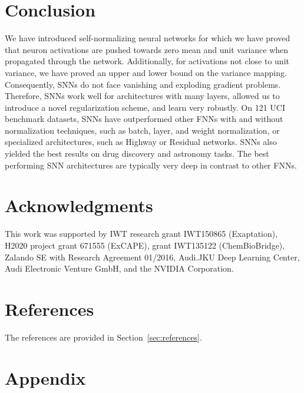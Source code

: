 \documentclass{article}
\begin{document}
\section*{Conclusion}
We have introduced self-normalizing neural networks for 
which we have proved that neuron activations are pushed towards zero mean and unit variance
when propagated through the network. 
Additionally, for activations not close to unit
variance, we have proved an upper and lower bound 
on the variance mapping. Consequently, SNNs do not face vanishing and exploding gradient 
problems.  Therefore, SNNs work well for architectures with many layers, allowed us to introduce a 
novel regularization scheme, and learn very robustly.
On 121 UCI benchmark datasets, SNNs have outperformed other FNNs with and without normalization techniques, 
such as batch, layer, and weight normalization, or specialized architectures, such as Highway or 
Residual networks. 
SNNs also yielded the best results on drug discovery and astronomy tasks.
The best performing SNN architectures are typically very deep in contrast to other FNNs. 





\section*{Acknowledgments}
This work was supported by IWT research grant IWT150865 (Exaptation), H2020 project
grant 671555 (ExCAPE), grant IWT135122 (ChemBioBridge), 
Zalando SE with Research Agreement 01/2016, 
Audi.JKU Deep Learning Center, Audi Electronic Venture GmbH, 
and the NVIDIA Corporation.


\section*{References}
The references are provided in Section~\ref{sec:references}.



\section*{Appendix}
\renewcommand{\thesection}{A\arabic{section}}
\renewcommand{\thefigure}{A\arabic{figure}}
\renewcommand{\thetable}{A\arabic{table}}

\sectionfont{\large}
\subsectionfont{\normalsize}
\subsubsectionfont{\normalsize}
\paragraphfont{\normalsize}
\end{document}
